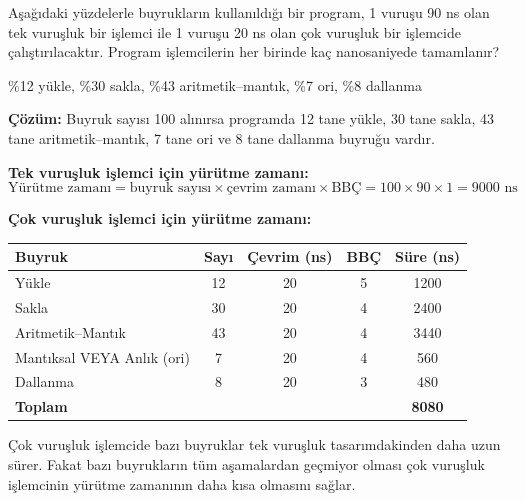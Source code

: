 \begin{ornek}
Aşağıdaki yüzdelerle buyrukların kullanıldığı bir program, 1 vuruşu 90 ns olan tek vuruşluk bir işlemci ile 1 vuruşu 20 ns olan çok vuruşluk bir işlemcide çalıştırılacaktır. Program işlemcilerin her birinde kaç nanosaniyede tamamlanır?

\begin{center}
\%12 yükle, \%30 sakla, \%43 aritmetik--mantık, \%7 ori, \%8 dallanma
\end{center}

\tcblower
\textbf{Çözüm:} Buyruk sayısı 100 alınırsa programda 12 tane yükle, 30 tane sakla, 43 tane aritmetik--mantık, 7 tane ori ve 8 tane dallanma buyruğu vardır.

\textbf{Tek vuruşluk işlemci için yürütme zamanı:}
\[
\text{Yürütme zamanı} = \text{buyruk sayısı} \times \text{çevrim zamanı} \times \text{BBÇ} = 100 \times 90 \times 1 = 9000 \text{ ns}
\]

\textbf{Çok vuruşluk işlemci için yürütme zamanı:}

\begin{center}
\begin{tabular}{lcccc}
\toprule
\textbf{Buyruk} & \textbf{Sayı} & \textbf{Çevrim (ns)} & \textbf{BBÇ} & \textbf{Süre (ns)} \\
\midrule
Yükle & 12 & 20 & 5 & 1200 \\
Sakla & 30 & 20 & 4 & 2400 \\
Aritmetik--Mantık & 43 & 20 & 4 & 3440 \\
Mantıksal VEYA Anlık (ori) & 7 & 20 & 4 & 560 \\
Dallanma & 8 & 20 & 3 & 480 \\
\midrule
\textbf{Toplam} & & & & \textbf{8080} \\
\bottomrule
\end{tabular}
\end{center}

Çok vuruşluk işlemcide bazı buyruklar tek vuruşluk tasarımdakinden daha uzun sürer. Fakat bazı buyrukların tüm aşamalardan geçmiyor olması çok vuruşluk işlemcinin yürütme zamanının daha kısa olmasını sağlar.
\end{ornek}

